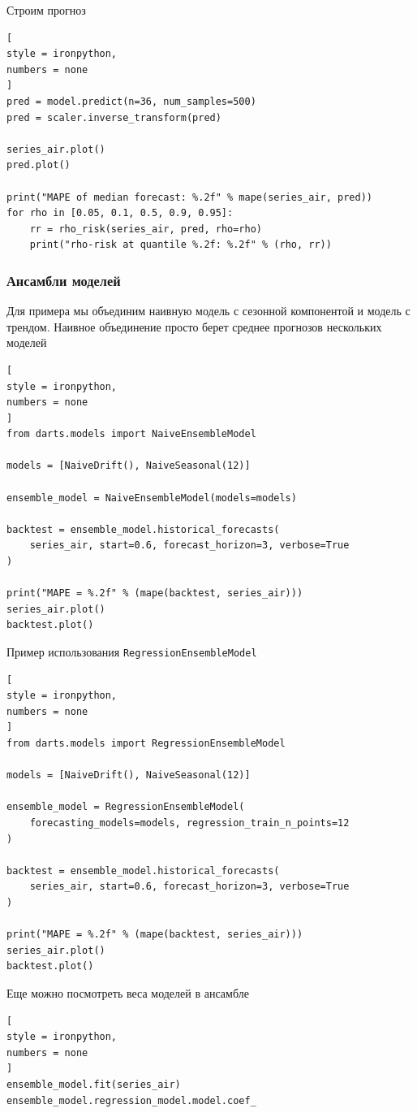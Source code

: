 \documentclass[%
	11pt,
	a4paper,
	utf8,
		]{article}
\begin{document}
Строим прогноз
\begin{lstlisting}[
style = ironpython,
numbers = none
]
pred = model.predict(n=36, num_samples=500)
pred = scaler.inverse_transform(pred)

series_air.plot()
pred.plot()

print("MAPE of median forecast: %.2f" % mape(series_air, pred))
for rho in [0.05, 0.1, 0.5, 0.9, 0.95]:
	rr = rho_risk(series_air, pred, rho=rho)
	print("rho-risk at quantile %.2f: %.2f" % (rho, rr))
\end{lstlisting}

\subsubsection{Ансамбли моделей}

Для примера мы объединим наивную модель с сезонной компонентой и модель с трендом. Наивное объединение просто берет среднее прогнозов нескольких моделей
\begin{lstlisting}[
style = ironpython,
numbers = none
]
from darts.models import NaiveEnsembleModel

models = [NaiveDrift(), NaiveSeasonal(12)]

ensemble_model = NaiveEnsembleModel(models=models)

backtest = ensemble_model.historical_forecasts(
	series_air, start=0.6, forecast_horizon=3, verbose=True
)

print("MAPE = %.2f" % (mape(backtest, series_air)))
series_air.plot()
backtest.plot()
\end{lstlisting}

Пример использования \verb|RegressionEnsembleModel|
\begin{lstlisting}[
style = ironpython,
numbers = none
]
from darts.models import RegressionEnsembleModel

models = [NaiveDrift(), NaiveSeasonal(12)]

ensemble_model = RegressionEnsembleModel(
	forecasting_models=models, regression_train_n_points=12
)

backtest = ensemble_model.historical_forecasts(
	series_air, start=0.6, forecast_horizon=3, verbose=True
)

print("MAPE = %.2f" % (mape(backtest, series_air)))
series_air.plot()
backtest.plot()
\end{lstlisting}

Еще можно посмотреть веса моделей в ансамбле
\begin{lstlisting}[
style = ironpython,
numbers = none
]
ensemble_model.fit(series_air)
ensemble_model.regression_model.model.coef_
\end{lstlisting}
\end{document}
